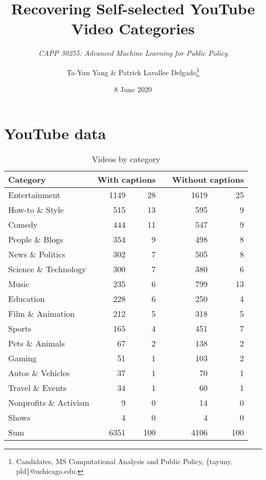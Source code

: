 \documentclass[letterpaper, 12pt]{article}
\title{Recovering Self-selected YouTube Video Categories}
\subtitle{\textit{CAPP 30255: Advanced Machine Learning for Public Policy}}
\author{Ta-Yun Yang \& Patrick Lavallee Delgado\thanks{Candidates, MS Computational Analysis and Public Policy, \{tayuny, pld\}@uchicago.edu.}}
\date{8 June 2020}
\begin{document}
\maketitle

\section{YouTube data}

\begin{table}[H]
  \centering
  \caption*{Videos by category}
  \begin{tabular}{lrr@{\%}p{1em}rr@{\%}}
    \toprule
    Category & \multicolumn{2}{l}{\enspace With captions \enspace} & & \multicolumn{2}{l}{Without captions} \\
    \midrule
    Entertainment           & 1149  & 28  & & 1619  & 25 \\
    How-to \& Style         & 515   & 13  & & 595   & 9  \\
    Comedy                  & 444   & 11  & & 547   & 9  \\
    People \& Blogs         & 354   & 9   & & 498   & 8  \\
    News \& Politics        & 302   & 7   & & 505   & 8  \\
    Science \& Technology   & 300   & 7   & & 380   & 6  \\
    Music                   & 235   & 6   & & 799   & 13 \\
    Education               & 228   & 6   & & 250   & 4  \\ 
    Film \& Animation       & 212   & 5   & & 318   & 5  \\
    Sports                  & 165   & 4   & & 451   & 7  \\
    Pets \& Animals         & 67    & 2   & & 138   & 2  \\
    Gaming                  & 51    & 1   & & 103   & 2  \\
    Autos \& Vehicles       & 37    & 1   & & 70    & 1  \\
    Travel \& Events        & 34    & 1   & & 60    & 1  \\
    Nonprofits \& Activism  & 9     & 0   & & 14    & 0  \\
    Shows                   & 4     & 0   & & 4     & 0  \\
    \bottomrule
    Sum                     & 6351  & 100 & & 4106  & 100 \\
  \end{tabular}
\end{table}
\end{document}
